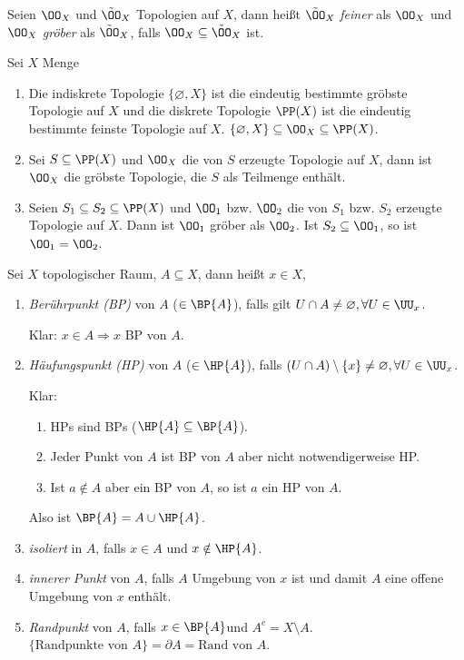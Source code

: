 \begin{defn}
\label{defn:1.1.19}
Seien $\OO_X$ und $\tilde{\OO}_X$ Topologien auf $X$, dann heißt
$\tilde{\OO}_X$ \emph{feiner} als $\OO_X$ und $\OO_X$ \emph{gröber} als
$\tilde{\OO}_X$, falls $\OO_X \subseteq \tilde{\OO}_X$ ist.\fishhere
\end{defn}

\begin{lem}
\label{prop:1.1.10}
Sei $X$ Menge
\begin{enumerate}
  \item Die indiskrete Topologie $\{\varnothing,X\}$ ist die eindeutig
  bestimmte gröbste Topologie auf $X$ und die diskrete Topologie $\PP(X)$ ist
  die eindeutig bestimmte feinste Topologie auf $X$.
  $\{\varnothing,X\}\subseteq\OO_X\subseteq \PP(X)$.
  \item Sei $S\subseteq \PP(X)$ und $\OO_X$ die von $S$ erzeugte Topologie auf
  $X$, dann ist $\OO_X$ die gröbste Topologie, die $S$ als Teilmenge enthält.
  \item Seien $S_1\subseteq S_2\subseteq \PP(X)$ und $\OO_1$ bzw. $\OO_2$ die
  von $S_1$ bzw. $S_2$ erzeugte Topologie auf $X$. Dann ist $\OO_1$ gröber als
  $\OO_2$. Ist $S_2\subseteq \OO_1$, so ist $\OO_1=\OO_2$.
\end{enumerate}
\end{lem}

\begin{defn}
\label{defn:1.1.11}
Sei $X$ topologischer Raum, $A\subseteq X$, dann heißt $x\in X$,
\begin{enumerate}
  \item \emph{Berührpunkt (BP)} von $A$ ($\in\BP{A}$), falls gilt $U\cap A \neq
  \varnothing,\forall U\in\UU_x$.
  
  Klar: $x\in A \Rightarrow x$ BP von $A$.
  \item \emph{Häufungspunkt (HP)} von $A$ ($\in\HP{A}$), falls $(U\cap
  A)\setminus\{x\} \neq \varnothing,\forall U\in\UU_x$.
  
  Klar:
  \begin{enumerate}[label=\arabic{*}.)]
    \item HPs sind BPs ($\HP{A}\subseteq\BP{A}$).
    \item Jeder Punkt von $A$ ist BP von $A$ aber nicht notwendigerweise HP.
    \item Ist $a\notin A$ aber ein BP von $A$, so ist $a$ ein HP von $A$.
  \end{enumerate}
  Also ist $\BP{A} = A\cup\HP{A}$.
  \item \emph{isoliert} in $A$, falls $x\in A$ und $x\notin \HP{A}$.
  \item \emph{innerer Punkt} von $A$, falls $A$
  Umgebung von $x$ ist und damit $A$ eine offene Umgebung von $x$ enthält.
  \item \emph{Randpunkt} von $A$, falls $x\in\BP{A}$und $A^c =
  X\setminus A$.\\ $\{\text{Randpunkte von }A \} = \partial A = \text{Rand von
  }A$.\fishhere
\end{enumerate}
\end{defn}

